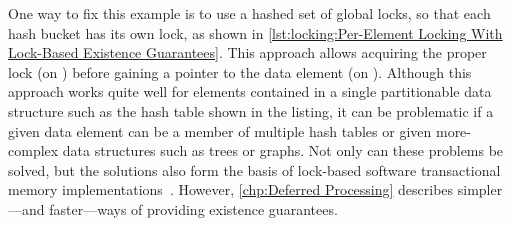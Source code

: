 \begin{fcvref}
One way to fix this example is to use a hashed set of global locks, so
that each hash bucket has its own lock, as shown in
\cref{lst:locking:Per-Element Locking With Lock-Based Existence Guarantees}.
This approach allows acquiring the proper lock (on ) before
gaining a pointer to the data element (on ).
Although this approach works quite well for elements contained in a
single partitionable data structure such as the hash table shown in the
listing, it can be problematic if a given data element can be a member
of multiple hash tables or given more-complex data structures such
as trees or graphs.
Not only can these problems be solved, but the solutions also form
the basis of lock-based software transactional memory
implementations~\cite{Shavit95,DaveDice2006DISC}.
However,
\cref{chp:Deferred Processing}
describes simpler---and faster---ways of providing existence guarantees.
\end{fcvref}

